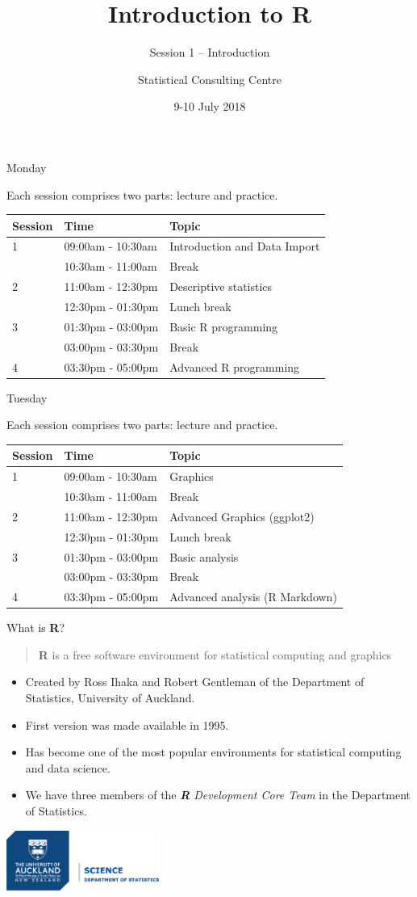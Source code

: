 \documentclass[ignorenonframetext,]{beamer}
\author[SCC]{Statistical Consulting Centre}
\institute[\href{mailto:consulting@stat.auckland.ac.nz}
			{consulting@stat.auckland.ac.nz}]{\href{mailto:consulting@stat.auckland.ac.nz}
			{consulting@stat.auckland.ac.nz}\\
			The Department of Statistics\\
			The University of Auckland}
\title{Introduction to \textbf{R}}
\subtitle{Session 1 -- Introduction}
\date{9-10 July 2018}
\providecommand{\tightlist}{%
  \setlength{\itemsep}{0pt}\setlength{\parskip}{0pt}}
\begin{document}
\frame{\titlepage}

\begin{frame}{Monday}

Each session comprises two parts: lecture and practice.

\begin{longtable}[]{@{}lll@{}}
\toprule
Session & Time & Topic\tabularnewline
\midrule
\endhead
1 & 09:00am - 10:30am & Introduction and Data Import\tabularnewline
& 10:30am - 11:00am & Break\tabularnewline
2 & 11:00am - 12:30pm & Descriptive statistics\tabularnewline
& 12:30pm - 01:30pm & Lunch break\tabularnewline
3 & 01:30pm - 03:00pm & Basic R programming\tabularnewline
& 03:00pm - 03:30pm & Break\tabularnewline
4 & 03:30pm - 05:00pm & Advanced R programming\tabularnewline
\bottomrule
\end{longtable}

\end{frame}

\begin{frame}{Tuesday}

Each session comprises two parts: lecture and practice.

\begin{longtable}[]{@{}lll@{}}
\toprule
Session & Time & Topic\tabularnewline
\midrule
\endhead
1 & 09:00am - 10:30am & Graphics\tabularnewline
& 10:30am - 11:00am & Break\tabularnewline
2 & 11:00am - 12:30pm & Advanced Graphics (ggplot2)\tabularnewline
& 12:30pm - 01:30pm & Lunch break\tabularnewline
3 & 01:30pm - 03:00pm & Basic analysis\tabularnewline
& 03:00pm - 03:30pm & Break\tabularnewline
4 & 03:30pm - 05:00pm & Advanced analysis (R Markdown)\tabularnewline
\bottomrule
\end{longtable}

\end{frame}

\begin{frame}{What is \textbf{R}?}

\begin{quote}
\textbf{R} is a free software environment for statistical computing and
graphics
\end{quote}

\begin{itemize}
\tightlist
\item
  Created by Ross Ihaka and Robert Gentleman of the Department of
  Statistics, University of Auckland.
\item
  First version was made available in 1995.
\item
  Has become one of the most popular environments for statistical
  computing and data science.
\item
  We have three members of the \emph{\textbf{R} Development Core Team}
  in the Department of Statistics.
\end{itemize}

\center \includegraphics[width=5.00000cm]{..//..//S-DS-VC-RGB.png}

\end{frame}
\end{document}
